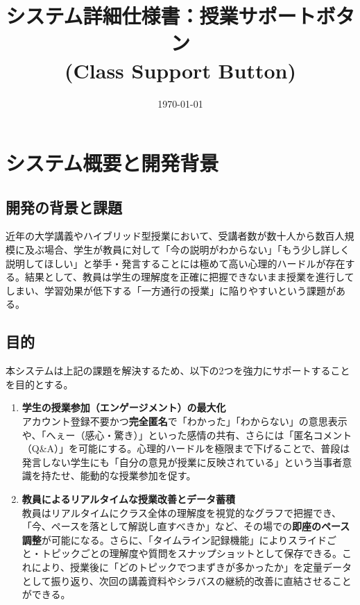 \documentclass[11pt,a4paper]{jsarticle}
\title{システム詳細仕様書：授業サポートボタン \\ (Class Support Button)}
\author{}
\date{\today}
\begin{document}
\maketitle

\tableofcontents
\newpage

\section{システム概要と開発背景}

\subsection{開発の背景と課題}
近年の大学講義やハイブリッド型授業において、受講者数が数十人から数百人規模に及ぶ場合、学生が教員に対して「今の説明がわからない」「もう少し詳しく説明してほしい」と挙手・発言することには極めて高い心理的ハードルが存在する。結果として、教員は学生の理解度を正確に把握できないまま授業を進行してしまい、学習効果が低下する「一方通行の授業」に陥りやすいという課題がある。

\subsection{目的}
本システムは上記の課題を解決するため、以下の2つを強力にサポートすることを目的とする。

\begin{enumerate}
    \item \textbf{学生の授業参加（エンゲージメント）の最大化} \\
    アカウント登録不要かつ\textbf{完全匿名}で「わかった」「わからない」の意思表示や、「へぇー（感心・驚き）」といった感情の共有、さらには「匿名コメント（Q\&A）」を可能にする。心理的ハードルを極限まで下げることで、普段は発言しない学生にも「自分の意見が授業に反映されている」という当事者意識を持たせ、能動的な授業参加を促す。
    
    \item \textbf{教員によるリアルタイムな授業改善とデータ蓄積} \\
    教員はリアルタイムにクラス全体の理解度を視覚的なグラフで把握でき、「今、ペースを落として解説し直すべきか」など、その場での\textbf{即座のペース調整}が可能になる。さらに、「タイムライン記録機能」によりスライドごと・トピックごとの理解度や質問をスナップショットとして保存できる。これにより、授業後に「どのトピックでつまずきが多かったか」を定量データとして振り返り、次回の講義資料やシラバスの継続的改善に直結させることができる。
\end{enumerate}
\end{document}
